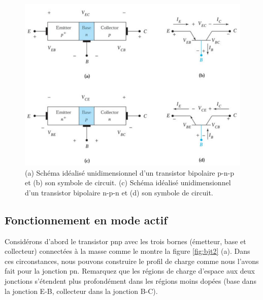 \begin{figure}[h!]
\centering
\includegraphics[width=12cm]{figures/ch01/bjt1.jpg}
\caption{(a) Schéma idéalisé unidimensionnel d'un transistor bipolaire p-n-p et (b) son symbole de circuit. (c) Schéma idéalisé unidimensionnel d'un transistor bipolaire n-p-n et (d) son symbole de circuit.} 
\label{fig:bjt1}
\end{figure}

\subsection{Fonctionnement en mode actif}
Considérons d'abord le transistor pnp avec les trois bornes (émetteur, base et collecteur) connectées à la masse comme le montre la figure \ref{fig:bjt2} (a). Dans ces circonstances, nous pouvons construire le profil de charge comme nous l'avons fait pour la jonction pn. Remarquez que les régions de charge d'espace aux deux jonctions s'étendent plus profondément dans les régions moins dopées (base dans la jonction E-B, collecteur dans la jonction B-C).

